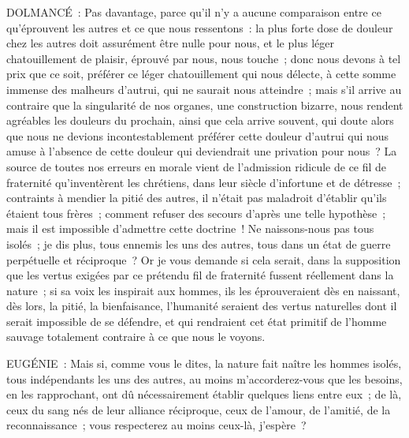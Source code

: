 \documentclass[french,twoside]{book} %
\begin{document}
DOLMANCÉ : Pas davantage, parce qu’il n’y a aucune comparaison entre ce qu’éprouvent les autres et ce que nous ressentons : la plus forte dose de douleur chez les autres doit assurément être nulle pour nous, et le plus léger chatouillement de plaisir, éprouvé par nous, nous touche ; donc nous devons à tel prix que ce soit, préférer ce léger chatouillement qui nous délecte, à cette somme immense des malheurs d’autrui, qui ne saurait nous atteindre ; mais s’il arrive au contraire que la singularité de nos organes, une construction bizarre, nous rendent agréables les douleurs du prochain, ainsi que cela arrive souvent, qui doute alors que nous ne devions incontestablement préférer cette douleur d’autrui qui nous amuse à l’absence de cette douleur qui deviendrait une privation pour nous ? La source de toutes nos erreurs en morale vient de l’admission ridicule de ce fil de fraternité qu’inventèrent les chrétiens, dans leur siècle d’infortune et de détresse ; contraints à mendier la pitié des autres, il n’était pas maladroit d’établir qu’ils étaient tous frères ; comment refuser des secours d’après une telle hypothèse ; mais il est impossible d’admettre cette doctrine ! Ne naissons-nous pas tous isolés ; je dis plus, tous ennemis les uns des autres, tous dans un état de guerre perpétuelle et réciproque ? Or je vous demande si cela serait, dans la supposition que les vertus exigées par ce prétendu fil de fraternité fussent réellement dans la nature ; si sa voix les inspirait aux hommes, ils les éprouveraient dès en naissant, dès lors, la pitié, la bienfaisance, l’humanité seraient des vertus naturelles dont il serait impossible de se défendre, et qui rendraient cet état primitif de l’homme sauvage totalement contraire à ce que nous le voyons.\par
EUGÉNIE : Mais si, comme vous le dites, la nature fait naître les hommes isolés, tous indépendants les uns des autres, au moins m’accorderez-vous que les besoins, en les rapprochant, ont dû nécessairement établir quelques liens entre eux ; de là, ceux du sang nés de leur alliance réciproque, ceux de l’amour, de l’amitié, de la reconnaissance ; vous respecterez au moins ceux-là, j’espère ?\par
\end{document}
